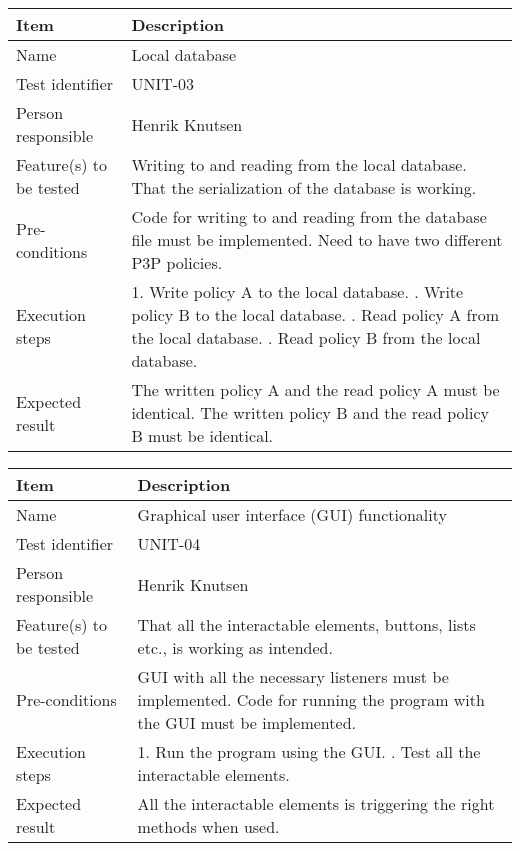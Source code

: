 \documentclass[12pt, fullpage, oneside]{report}
\begin{document}
		\begin{center}
			\begin{tabular}{ |  p{3.5cm} | p{10cm} | }
				\hline
				Item & Description \\ [5pt] \hline \hline
				Name & Local database \\  [5pt] \hline
				Test identifier & UNIT-03 \\  [5pt] \hline
				Person responsible & Henrik Knutsen \\  [5pt] \hline
				Feature(s) to be tested & Writing to and reading from the local database. That the serialization of the database is working. \\  [5pt] \hline
				Pre-conditions & Code for writing to and reading from the database file must be implemented. Need to have two different P3P policies. \\  [5pt] \hline
				Execution steps & 1. Write policy A to the local database. \newline 2. Write policy B to the local database. \newline 3. Read policy A from the local database. \newline 4. Read policy B from the local database. \\  [5pt] \hline
				Expected result & The written policy A and the read policy A must be identical. \newline The written policy B and the read policy B must be identical. \\  [5pt] \hline
			\end{tabular}
		\end{center}

		\begin{center}
			\begin{tabular}{ |  p{3.5cm} | p{10cm} | }
				\hline
				Item & Description \\ [5pt] \hline \hline
				Name & Graphical user interface (GUI) functionality \\  [5pt] \hline
				Test identifier & UNIT-04 \\  [5pt] \hline
				Person responsible & Henrik Knutsen \\  [5pt] \hline
				Feature(s) to be tested & That all the interactable elements, buttons, lists etc., is working as intended. \\  [5pt] \hline
				Pre-conditions & GUI with all the necessary listeners must be implemented. Code for running the program with the GUI must be implemented. \\  [5pt] \hline
				Execution steps & 1. Run the program using the GUI. \newline 2. Test all the interactable elements. \\  [5pt] \hline
				Expected result & All the interactable elements is triggering the right methods when used. \\  [5pt] \hline
			\end{tabular}
		\end{center}
\end{document}
